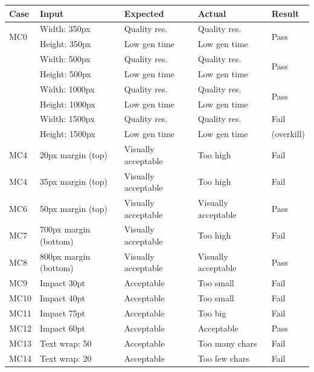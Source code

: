 \documentclass[12pt]{report}
\begin{document}
\begin{appendices}
\begin{table}[ht]
  \centering
  \begin{tabular}{@{\extracolsep{1pt}}lllll}
  \toprule   
  {Case} & {Input} & {Expected} & {Actual} & {Result}\\
  \midrule
  \multirow{2}{*}{MC0} & Width: 350px & Quality res. & Quality res. & \multirow{2}{*}{Pass}\\ 
  & Height: 350px & Low gen time & Low gen time & \\
  \addlinespace[3pt]
  \multirow{2}{*}{MC1} & Width: 500px & Quality res. & Quality res. & \multirow{2}{*}{Pass}\\ 
  & Height: 500px & Low gen time & Low gen time & \\
  \addlinespace[3pt]
  \multirow{2}{*}{MC2} & Width: 1000px & Quality res. & Quality res. & \multirow{2}{*}{Pass}\\ 
  & Height: 1000px & Low gen time & Low gen time & \\
  \addlinespace[3pt]
  \multirow{2}{*}{MC3} & Width: 1500px & Quality res. & Quality res. & Fail\\ 
  & Height: 1500px & Low gen time & Low gen time & (overkill) \\
  \addlinespace[3pt]
  MC4 & 20px margin (top) & Visually acceptable & Too high & Fail\\ 
  \addlinespace[3pt]
  MC4 & 35px margin (top) & Visually acceptable & Too high & Fail\\ 
  \addlinespace[3pt]
  MC6 & 50px margin (top) & Visually acceptable & Visually acceptable & Pass\\ 
  \addlinespace[3pt]
  MC7 & 700px margin (bottom) & Visually acceptable & Too high & Fail\\ 
  \addlinespace[3pt]
  MC8 & 800px margin (bottom) & Visually acceptable & Visually acceptable & Pass\\ 
  \addlinespace[3pt]
  MC9 & Impact 30pt & Acceptable & Too small & Fail\\ 
  \addlinespace[3pt]
  MC10 & Impact 40pt & Acceptable & Too small & Fail\\ 
  \addlinespace[3pt]
  MC11 & Impact 75pt & Acceptable & Too big & Fail\\ 
  \addlinespace[3pt]
  MC12 & Impact 60pt & Acceptable & Acceptable & Pass\\ 
  \addlinespace[3pt]
  MC13 & Text wrap: 50 & Acceptable & Too many chars & Fail\\ 
  \addlinespace[3pt]
  MC14 & Text wrap: 20 & Acceptable & Too few chars & Fail\\ 

\end{tabular}
\end{table}
\end{appendices}
\end{document}
